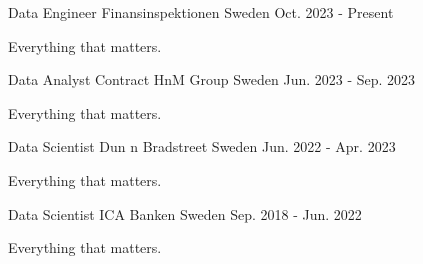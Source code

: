

\begin{cventries}

    \cventry
    {Data Engineer} %
    {Finansinspektionen} %
    {Sweden} %
    {Oct. 2023 - Present} %
    {
      \begin{cvitems} %
        \item {Everything that matters.}
      \end{cvitems}
    }

    \cventry
    {Data Analyst Contract} %
    {HnM Group} %
    {Sweden} %
    {Jun. 2023 - Sep. 2023} %
    {
      \begin{cvitems} %
        \item {Everything that matters.}
      \end{cvitems}
    }

  \cventry
    {Data Scientist} %
    {Dun n Bradstreet} %
    {Sweden} %
    {Jun. 2022 - Apr. 2023} %
    {
      \begin{cvitems} %
        \item {Everything that matters.}
      \end{cvitems}
    }

  \cventry
    {Data Scientist} %
    {ICA Banken} %
    {Sweden} %
    {Sep. 2018 - Jun. 2022} %
    {
      \begin{cvitems} %
        \item {Everything that matters.}
      \end{cvitems}
    }

\end{cventries}